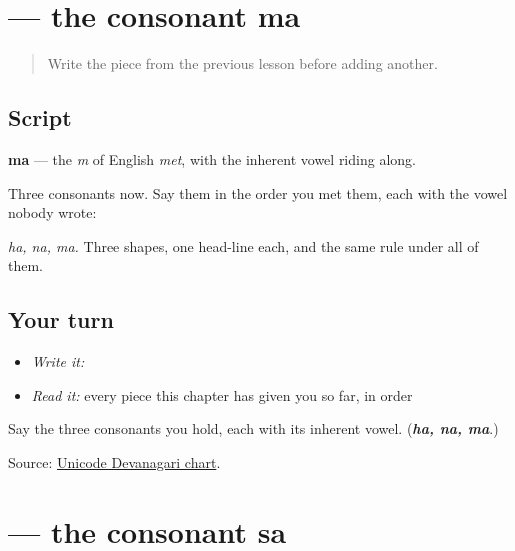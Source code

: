 \section[ma]{ — the consonant ma}

\label{lesson:MR-W01-ma}



\begin{quote}
Write the piece from the previous lesson before adding another.
\end{quote}

\subsection*{Script}
\begin{quote}
\end{quote}

\textbf{ma} — the \emph{m} of English \emph{met}, with the inherent vowel riding along.

Three consonants now. Say them in the order you met them, each with the vowel nobody wrote:

\begin{quote}
\textbf{}   \textbf{}   \textbf{}
\end{quote}

\emph{ha, na, ma.} Three shapes, one head-line each, and the same rule under all of them.

\subsection*{Your turn}
\begin{itemize}
\raggedright
  \item \emph{Write it:} 
  \item \emph{Read it:} every piece this chapter has given you so far, in order
\end{itemize}

\begin{tcolorbox}[breakable,colback=teal!4,colframe=teal!35!black,title={Before you move on}]
Say the three consonants you hold, each with its inherent vowel. (\emph{\textbf{ha, na, ma}}.)

Source: \href{https://www.unicode.org/charts/PDF/U0900.pdf}{Unicode Devanagari chart}.
\end{tcolorbox}
\section[sa]{ — the consonant sa}


